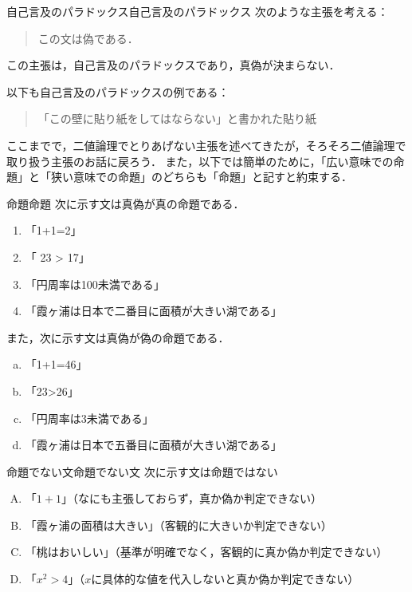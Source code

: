 \documentclass[a4paper,11pt]{ltjsarticle}
\begin{document}
\begin{example}{自己言及のパラドックス}{自己言及のパラドックス}
	次のような主張を考える：
	\begin{quote}
		この文は偽である．
	\end{quote}
	この主張は，自己言及のパラドックスであり，真偽が決まらない．
	
	以下も自己言及のパラドックスの例である：
	\begin{quote}
		「この壁に貼り紙をしてはならない」と書かれた貼り紙
	\end{quote}
\end{example}

ここまでで，二値論理でとりあげない主張を述べてきたが，そろそろ二値論理で取り扱う主張のお話に戻ろう．
また，以下では簡単のために，「広い意味での命題」と「狭い意味での命題」のどちらも「命題」と記すと約束する．

\begin{example}{命題}{命題}
    次に示す文は真偽が真の命題である．
    \begin{enumerate}[(1)]
        \item 「1+1=2」
        \item 「 23 > 17」
        \item 「円周率は100未満である」
        \item 「霞ヶ浦は日本で二番目に面積が大きい湖である」
    \end{enumerate}
    また，次に示す文は真偽が偽の命題である．
    \begin{enumerate}[(a)]
        \item 「1+1=46」
        \item 「23>26」
        \item 「円周率は3未満である」
        \item 「霞ヶ浦は日本で五番目に面積が大きい湖である」
    \end{enumerate}
\end{example}

\begin{example}{命題でない文}{命題でない文}
    次に示す文は命題ではない
    \begin{enumerate}[(A)]
    \item 「$1+1$」（なにも主張しておらず，真か偽か判定できない）
    \item 「霞ヶ浦の面積は大きい」（客観的に大きいか判定できない）
    \item 「桃はおいしい」（基準が明確でなく，客観的に真か偽か判定できない）
    \item 「$x^2 > 4$」（$x$に具体的な値を代入しないと真か偽か判定できない）
    \end{enumerate}
\end{example}
\end{document}
